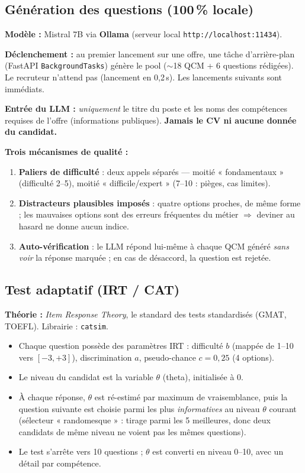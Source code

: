 \documentclass[11pt,a4paper]{article}
\begin{document}
\subsection{Génération des questions (100\,\% locale)}
\textbf{Modèle :} Mistral 7B via \textbf{Ollama} (serveur local
\texttt{http://localhost:11434}).

\textbf{Déclenchement :} au premier lancement sur une offre, une tâche d'arrière-plan
(FastAPI \texttt{BackgroundTasks}) génère le pool ($\sim$18 QCM + 6 questions rédigées).
Le recruteur n'attend pas (lancement en 0,2\,s). Les lancements suivants sont immédiats.

\textbf{Entrée du LLM :} \emph{uniquement} le titre du poste et les noms des compétences
requises de l'offre (informations publiques). \textbf{Jamais le CV ni aucune donnée du
candidat.}

\textbf{Trois mécanismes de qualité :}
\begin{enumerate}
  \item \textbf{Paliers de difficulté} : deux appels séparés --- moitié « fondamentaux »
        (difficulté 2--5), moitié « difficile/expert » (7--10 : pièges, cas limites).
  \item \textbf{Distracteurs plausibles imposés} : quatre options proches, de même forme ;
        les mauvaises options sont des erreurs fréquentes du métier $\Rightarrow$ deviner
        au hasard ne donne aucun indice.
  \item \textbf{Auto-vérification} : le LLM répond lui-même à chaque QCM généré
        \emph{sans voir} la réponse marquée ; en cas de désaccord, la question est rejetée.
\end{enumerate}

\subsection{Test adaptatif (IRT / CAT)}
\textbf{Théorie :} \emph{Item Response Theory}, le standard des tests standardisés
(GMAT, TOEFL). Librairie : \texttt{catsim}.

\begin{itemize}
  \item Chaque question possède des paramètres IRT : difficulté $b$ (mappée de 1--10 vers
        $[-3, +3]$), discrimination $a$, pseudo-chance $c = 0{,}25$ (4 options).
  \item Le niveau du candidat est la variable $\theta$ (theta), initialisée à 0.
  \item À chaque réponse, $\theta$ est ré-estimé par maximum de vraisemblance, puis la
        question suivante est choisie parmi les plus \emph{informatives} au niveau
        $\theta$ courant (sélecteur « randomesque » : tirage parmi les 5 meilleures,
        donc deux candidats de même niveau ne voient pas les mêmes questions).
  \item Le test s'arrête vers 10 questions ; $\theta$ est converti en niveau 0--10,
        avec un détail par compétence.
\end{itemize}
\end{document}
